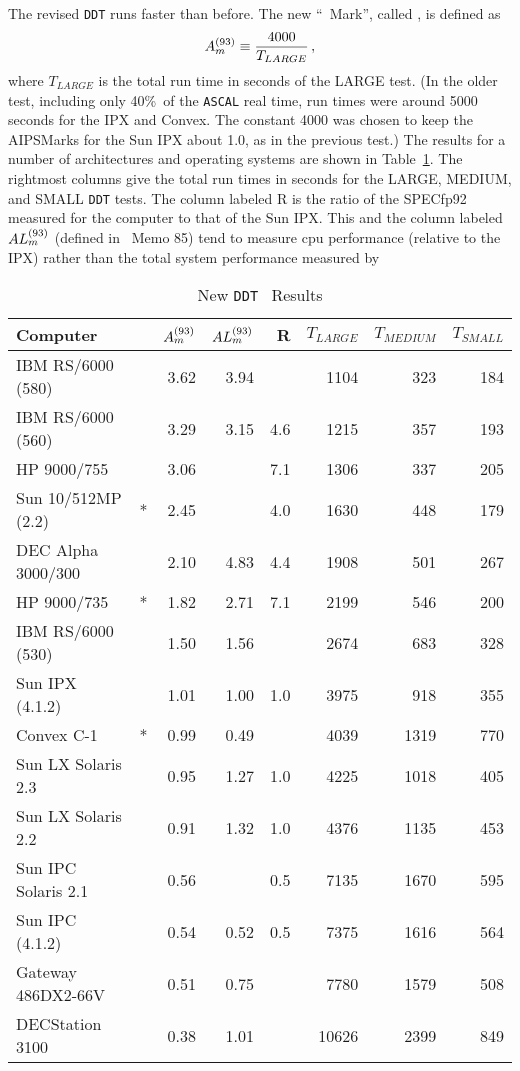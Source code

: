 The revised {\tt DDT} runs faster than before.  The new ``\AIPS\
Mark'', called \AMark, is defined as
$$
      A_m^{(93)} \equiv \frac{4000}{T_{LARGE}} \, ,
$$
where $T_{LARGE}$ is the total run time in seconds of the LARGE test.
(In the older test, including only 40\%\ of the {\tt ASCAL} real time,
run times were around 5000 seconds for the IPX and Convex.  The
constant 4000 was chosen to keep the AIPSMarks for the Sun IPX about
1.0, as in the previous test.)  The results for a number of
architectures and operating systems are shown in Table~\ref{ta:DDT}.
The rightmost columns give the total run times in seconds for the
LARGE, MEDIUM, and SMALL {\tt DDT} tests.  The column labeled R is the
ratio of the SPECfp92 measured for the computer to that of the Sun
\hbox{IPX}.  This and the column labeled $AL_m^{(93)}$ (defined in \AIPS\
Memo 85) tend to measure cpu performance (relative to the IPX) rather
than the total system performance measured by
\begin{table}
\protect\begin{center}
\protect\begin{tabular}{|lc|r|r|r|r|r|r|} \hline
Computer & & $A_m^{(93)}$ & $AL_m^{(93)}$ & R & $T_{LARGE}$ & $T_{MEDIUM}$ &
    $T_{SMALL}$  \\  \hline
IBM RS/6000 (580)  &   & 3.62 & 3.94 &     &  1104 &  323 &  184 \\
IBM RS/6000 (560)  &   & 3.29 & 3.15 & 4.6 &  1215 &  357 &  193 \\
HP 9000/755        &   & 3.06 &      & 7.1 &  1306 &  337 &  205 \\
Sun 10/512MP (2.2) & * & 2.45 &      & 4.0 &  1630 &  448 &  179 \\
DEC Alpha 3000/300 &   & 2.10 & 4.83 & 4.4 &  1908 &  501 &  267 \\
HP 9000/735        & * & 1.82 & 2.71 & 7.1 &  2199 &  546 &  200 \\
IBM RS/6000 (530)  &   & 1.50 & 1.56 &     &  2674 &  683 &  328 \\
Sun IPX (4.1.2)    &   & 1.01 & 1.00 & 1.0 &  3975 &  918 &  355 \\
Convex C-1         & * & 0.99 & 0.49 &     &  4039 & 1319 &  770 \\
Sun LX Solaris 2.3 &   & 0.95 & 1.27 & 1.0 &  4225 & 1018 &  405 \\
Sun LX Solaris 2.2 &   & 0.91 & 1.32 & 1.0 &  4376 & 1135 &  453 \\
Sun IPC Solaris 2.1&   & 0.56 &      & 0.5 &  7135 & 1670 &  595 \\
Sun IPC (4.1.2)    &   & 0.54 & 0.52 & 0.5 &  7375 & 1616 &  564 \\
Gateway 486DX2-66V &   & 0.51 & 0.75 &     &  7780 & 1579 &  508 \\
DECStation 3100    &   & 0.38 & 1.01 &     & 10626 & 2399 &  849 \\
\hline
\end{tabular}
\end{center}
\caption{New {\tt DDT} \AMark\ Results}
\label{ta:DDT}
\end{table}
